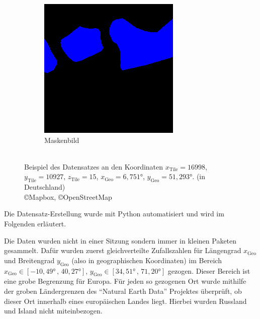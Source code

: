 \begin{figure}
\begin{subfigure}{0.3\textwidth}
        \includegraphics[width=\textwidth]{images/datensatz_beispiel_maske.png}
        \caption{Maskenbild}
        \label{fig:datensatz_beispiel_maske.png}
    \end{subfigure}
    \caption{\\Beispiel des Datensatzes an den Koordinaten %
            ${x_\text{Tile} = 16998}$, ${y_\text{Tile} = 10927}$, ${z_\text{Tile} = 15}$, %
            ${x_\text{Geo} = 6,751°}$, ${y_\text{Geo} = 51,293°}$. %
            (in Deutschland) \\ \copyright Mapbox, \copyright OpenStreetMap}
    \label{fig:datensatz_beispiel}
\end{figure}

Die Datensatz-Erstellung wurde mit Python automatisiert und wird im Folgenden erläutert.

Die Daten wurden nicht in einer Sitzung sondern immer in kleinen Paketen gesammelt.
Dafür wurden zuerst gleichverteilte Zufallszahlen für Längengrad $x_\text{Geo}$ und Breitengrad $y_\text{Geo}$ (also in geographischen Koordinaten) 
im Bereich ${x_\text{Geo} \in [-10,49° \,,\, 40,27°]}$, ${y_\text{Geo} \in [34,51° \,,\, 71,20°]}$ gezogen.
Dieser Bereich ist eine grobe Begrenzung für Europa.
Für jeden so gezogenen Ort wurde mithilfe der groben Ländergrenzen des \enquote{Natural Earth Data} Projektes überprüft, 
ob dieser Ort innerhalb eines europäischen Landes liegt. \cite{natural_earth_countries}
Hierbei wurden Russland und Island nicht miteinbezogen.


